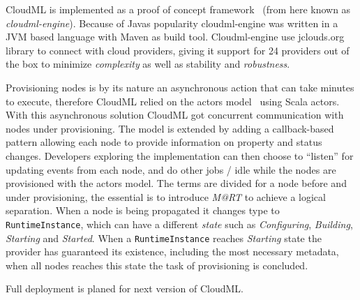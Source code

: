CloudML is implemented as a proof of concept framework~\cite{cloudml-engine}
(from here known as \emph{cloudml-engine}). 
Because of Javas popularity cloudml-engine was written in a JVM based language with Maven as build tool.
Cloudml-engine use jclouds.org library to connect with cloud providers, giving it support
for 24 providers out of the box to minimize \emph{complexity} as well as stability and \emph{robustness}.

Provisioning nodes is by its nature an asynchronous action that can take minutes to execute,
therefore CloudML relied on the actors model~\cite{actors:haller07} using Scala actors.
With this asynchronous solution CloudML got concurrent communication with nodes under provisioning.
The model is extended by adding a callback-based pattern allowing each node to provide 
information on property and status changes.
Developers exploring the implementation can then choose to ``listen'' for updating events from each node,
and do other jobs / idle while the nodes are provisioned with the actors model.
The terms are divided for a node before and under provisioning, the essential is to introduce 
\emph{M@RT} to achieve a logical separation.
When a node is being propagated it changes type to \texttt{RuntimeInstance}, 
which can have a different \emph{state} such as \emph{Configuring}, \emph{Building}, \emph{Starting} and \emph{Started}.
When a \texttt{RuntimeInstance} reaches \emph{Starting} state the provider has guaranteed its existence, including
the most necessary metadata, when all nodes reaches this state the task of provisioning is concluded.

Full deployment is planed for next version of CloudML.
